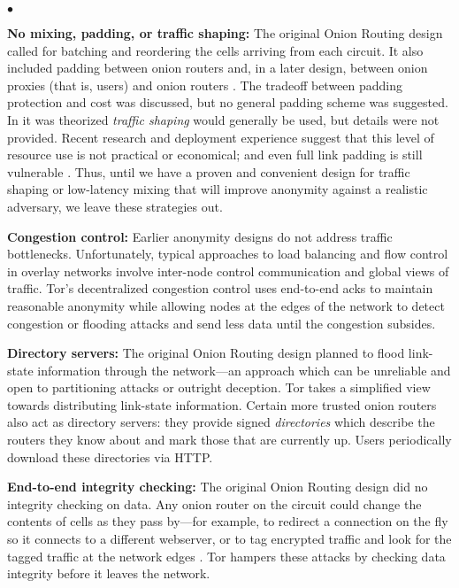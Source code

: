 \documentclass[times,10pt,twocolumn]{article}
\newenvironment{tightlist}{\begin{list}{$\bullet$}{
  \setlength{\itemsep}{0mm}
    \setlength{\parsep}{0mm}
    }}{\end{list}}
\begin{document}
\begin{tightlist}
\item \textbf{No mixing, padding, or traffic shaping:} The original
Onion Routing design called for batching and reordering the cells arriving
from each circuit. It also included padding between onion routers and,
in a later design, between onion
proxies (that is, users) and onion routers \cite{or-ih96,or-jsac98}.
The tradeoff between padding protection and cost was discussed, but no
general padding scheme was suggested. In
\cite{or-pet00} it was theorized \emph{traffic shaping} would generally
be used, but details were not provided.
Recent research \cite{econymics} and deployment
experience \cite{freedom21-security} suggest that this level of resource
use is not practical or economical; and even full link padding is still
vulnerable \cite{defensive-dropping}. Thus, until we have a proven and
convenient design for traffic shaping or low-latency mixing that
will improve anonymity against a realistic adversary, we leave these
strategies out.

\item \textbf{Congestion control:} Earlier anonymity designs do not
address traffic bottlenecks. Unfortunately, typical approaches to load
balancing and flow control in overlay networks involve inter-node control
communication and global views of traffic. Tor's decentralized congestion
control uses end-to-end acks to maintain reasonable anonymity while
allowing nodes
at the edges of the network to detect congestion or flooding attacks
and send less data until the congestion subsides.

\item \textbf{Directory servers:} The original Onion Routing design
planned to flood link-state information through the network---an
approach which can be unreliable and
open to partitioning attacks or outright deception. Tor takes a simplified
view towards distributing link-state information. Certain more trusted
onion routers also act as directory servers: they provide signed
\emph{directories} which describe the routers they know about and mark
those that
are currently up. Users periodically download these directories via HTTP.

\item \textbf{End-to-end integrity checking:} The original Onion Routing
design did no integrity checking on data. Any onion router on the circuit
could change the contents of cells as they pass by---for example, to
redirect a
connection on the fly so it connects to a different webserver, or to
tag encrypted traffic and look for the tagged traffic at the network
edges \cite{minion-design}.  Tor hampers these attacks by checking data
integrity before it leaves the network.


\end{tightlist}
\end{document}
